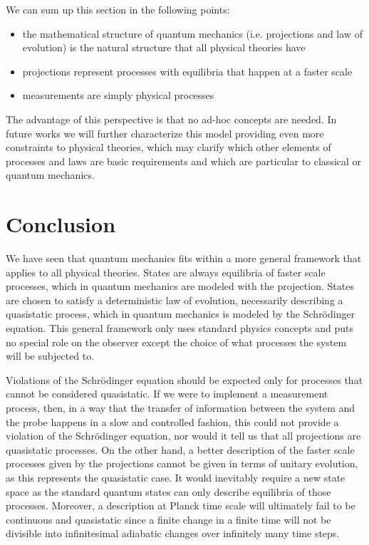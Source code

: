 \documentclass[11pt]{article}
\begin{document}
We can sum up this section in the following points:
\begin{itemize}
	\item the mathematical structure of quantum mechanics (i.e. projections and law of evolution) is the natural structure that all physical theories have
	\item projections represent processes with equilibria that happen at a faster scale 
	\item measurements are simply physical processes
\end{itemize}
The advantage of this perspective is that no ad-hoc concepts are needed. In future works we will further characterize this model providing even more constraints to physical theories, which may clarify which other elements of processes and laws are basic requirements and which are particular to classical or quantum mechanics.

\section{Conclusion}

We have seen that quantum mechanics fits within a more general framework that applies to all physical theories. States are always equilibria of faster scale processes, which in quantum mechanics are modeled with the projection. States are chosen to satisfy a deterministic law of evolution, necessarily describing a quasistatic process, which in quantum mechanics is modeled by the Schr\"{o}dinger equation. This general framework only uses standard physics concepts and puts no special role on the observer except the choice of what processes the system will be subjected to.

Violations of the Schr\"{o}dinger equation should be expected only for processes that cannot be considered quasistatic. If we were to implement a measurement process, then, in a way that the transfer of information between the system and the probe happens in a slow and controlled fashion, this could not provide a violation of the Schr\"{o}dinger equation, nor would it tell us that all projections are quasistatic processes. On the other hand, a better description of the faster scale processes given by the projections cannot be given in terms of unitary evolution, as this represents the quasistatic case. It would inevitably require a new state space as the standard quantum states can only describe equilibria of those processes. Moreover, a description at Planck time scale will ultimately fail to be continuous and quasistatic since a finite change in a finite time will not be divisible into infinitesimal adiabatic changes over infinitely many time steps.
\end{document}

